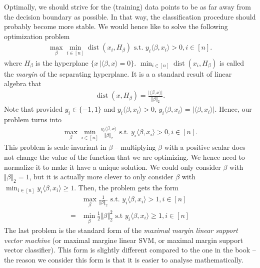 \documentclass{article}
\newcommand{\sprod}[1]{\langle #1 \rangle}
\newcommand{\abs}[1]{\vert #1 \vert}
\newcommand{\norm}[1]{\Vert #1 \Vert}
\DeclareMathOperator{\dist}{dist}
\begin{document}
Optimally, we should strive for the (training) data points to be as far away from the decision boundary as possible. In that way, the classification procedure should probably become more stable. We would hence like to solve the following optimization problem
\begin{align*}
    \max_\beta \min_{i \in [n]} \dist(x_i,H_\beta) \text{ s.t. } y_i \sprod{\beta,x_i}>0, i \in [n].
\end{align*}
where $H_\beta$ is the hyperplane $\{x \, \vert \sprod{\beta,x}=0\}$. $ \min_{i \in [n]} \dist(x_i,H_\beta)$ is called the \emph{margin} of the separating hyperplane. It is a a standard result of linear algebra  that
\begin{align*}
    \dist(x,H_\beta) = \frac{\abs{\sprod{\beta,x}}}{\norm{\beta}_2}.
\end{align*}
Note that provided $y_i \in \{-1,1\}$ and $y_i\sprod{\beta,x_i}>0$, $y_i\sprod{\beta,x_i} = \abs{\sprod{\beta,x_i}}$. Hence, our problem turns into
\begin{align*}
    \max_\beta \min_{i \in [n]}\frac{y_i\sprod{\beta,x}}{\norm{\beta}_2}\text{ s.t. } y_i \sprod{\beta,x_i}>0, i \in [n].
\end{align*}
This problem is scale-invariant in $\beta$ -- multiplying $\beta$ with a positive scalar does not change the value of the function that we are optimizing. We hence need to normalize it to make it have a unique solution. We could only consider $\beta$ with $\norm{\beta}_2=1$, but it is actually more clever to only consider $\beta$ with $\min_{i \in [n]} y_i \sprod{\beta,x_i}\geq 1$. Then, the problem gets the form
\begin{align}
    & \max_\beta \frac{1}{\norm{\beta}_2}\text{ s.t. } y_i\sprod{\beta,x_i}>1, i \in [n] \nonumber \\
     =& \min_\beta \tfrac{1}{2}\norm{\beta}_2^2 \text{ s.t } y_i\sprod{\beta,x_i}\geq 1, i \in [n] \label{eq:SVM}
\end{align}
The last problem is the standard form of the \emph{maximal margin linear support vector machine} (or maximal margine linear SVM, or maximal margin support vector classifier). This form is slightly different compared to the one in the book -- the reason we consider this form is that it is easier to analyse mathematically.
\end{document}
